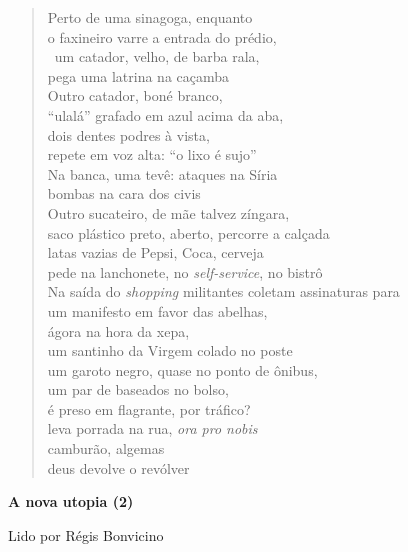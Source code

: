 \begin{verse}
Perto de uma sinagoga, enquanto\\
o faxineiro varre a entrada do prédio,\\\
um catador, velho, de barba rala,\\
pega uma latrina na caçamba\\[5pt]
Outro catador, boné branco,\\
``ulalá'' grafado em azul acima da aba,\\
dois dentes podres à vista,\\
repete em voz alta: ``o lixo é sujo''\\[5pt]
Na banca, uma tevê: ataques na Síria\\
bombas na cara dos civis\\
Outro sucateiro, de mãe talvez zíngara,\\
saco plástico preto, aberto, percorre a calçada\\[5pt]
latas vazias de Pepsi, Coca, cerveja\\
pede na lanchonete, no \emph{self-service}, no bistrô\\
Na saída do \emph{shopping} militantes coletam assinaturas para\\
um manifesto em favor das abelhas,\\[5pt]
ágora na hora da xepa,\\
um santinho da Virgem colado no poste\\
um garoto negro, quase no ponto de ônibus,\\
um par de baseados no bolso,\\[5pt]
é preso em flagrante, por tráfico?\\
leva porrada na rua, \emph{ora pro nobis}\\
camburão, algemas\\
deus devolve o revólver
\end{verse}

\pagebreak

\textbf{A nova utopia (2)}

Lido por Régis Bonvicino

